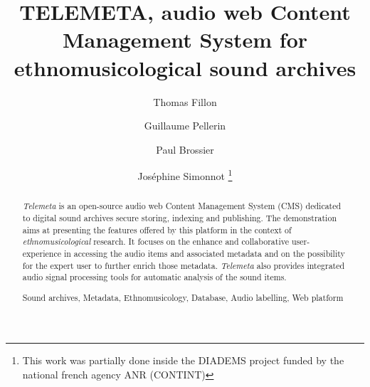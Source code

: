 \documentclass[runningheads,a4paper]{llncs}
\newcommand{\keywords}[1]{\par\addvspace\baselineskip
\noindent\keywordname\enspace\ignorespaces#1}
\begin{document}
\mainmatter  %

\title{TELEMETA, audio web Content Management System for ethnomusicological sound archives}


%
%
\author{Thomas Fillon \and Guillaume Pellerin \and Paul Brossier
 \and Jos{\'e}phine Simonnot 
\thanks{This work was partially done inside the DIADEMS project funded by the national french agency ANR (CONTINT)}
}
%


\maketitle

\setcounter{footnote}{0}


\begin{abstract}
\emph{Telemeta} is an open-source audio web Content Management System (CMS) dedicated to digital sound archives secure storing, indexing and publishing. The demonstration aims at presenting the features offered by this platform in the context of \emph{ethnomusicological} research. It focuses on the enhance and collaborative user-experience in accessing the audio items and associated metadata and on the possibility for the expert user to further enrich those metadata. \emph{Telemeta} also provides integrated audio signal processing tools for automatic analysis of the sound items.
\keywords{Sound archives, Metadata, Ethnomusicology, Database, Audio labelling, Web platform}
\end{abstract}
\end{document}
